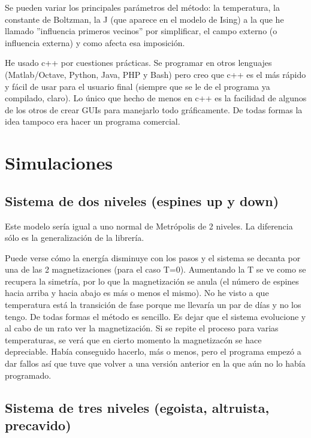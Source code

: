 \documentclass[a4paper,10pt,twocolumn]{article}
\begin{document}
Se pueden variar los principales par\'ametros del m\'etodo: la temperatura, la constante de Boltzman, la J (que aparece en el modelo de Ising) a la que he llamado ''influencia primeros vecinos'' por simplificar, el campo externo (o influencia externa) y como afecta esa imposici\'on.

He usado c++ por cuestiones pr\'acticas. Se programar en otros lenguajes (Matlab/Octave, Python, Java, PHP y Bash) pero creo que c++ es el m\'as r\'apido y f\'acil de usar para el usuario final (siempre que se le de el programa ya compilado, claro). Lo \'unico que hecho de menos en c++ es la facilidad de algunos de los otros de crear GUIs para manejarlo todo gr\'aficamente. De todas formas la idea tampoco era hacer un programa comercial. 

\section*{Simulaciones}
\subsection*{Sistema de dos niveles (espines up y down)}

Este modelo ser\'ia igual a uno normal de Metr\'opolis de 2 niveles. La diferencia s\'olo es la generalizaci\'on de la librer\'ia.


Puede verse c\'omo la energ\'ia disminuye con los pasos y el sistema se decanta por una de las 2 magnetizaciones (para el caso T=0). Aumentando la T se ve como se recupera la simetr\'ia, por lo que la magnetizaci\'on se anula (el n\'umero de espines hacia arriba y hacia abajo es m\'as o menos el mismo). No he visto a que temperatura est\'a la transici\'on de fase porque me llevar\'ia un par de d\'ias y no los tengo. De todas formas el m\'etodo es sencillo. Es dejar que el sistema evolucione y al cabo de un rato ver la magnetizaci\'on. Si se repite el proceso para varias temperaturas, se ver\'a que en cierto momento la magnetizac\'on se hace depreciable. Hab\'ia conseguido hacerlo, m\'as o menos, pero el programa empez\'o a dar fallos as\'i que tuve que volver a una versi\'on anterior en la que a\'un no lo hab\'ia programado.

\subsection*{Sistema de tres niveles (egoista, altruista, precavido)}
\end{document}
